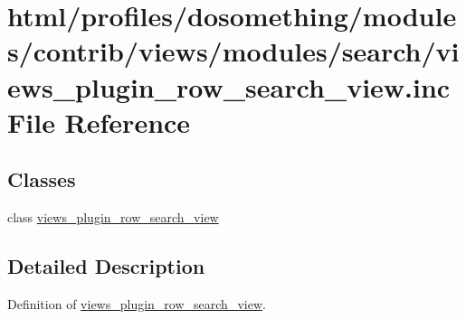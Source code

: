 \hypertarget{views__plugin__row__search__view_8inc}{
\section{html/profiles/dosomething/modules/contrib/views/modules/search/views\_\-plugin\_\-row\_\-search\_\-view.inc File Reference}
\label{views__plugin__row__search__view_8inc}
}
\subsection*{Classes}
\begin{DoxyCompactItemize}
\item 
class \hyperlink{classviews__plugin__row__search__view}{views\_\-plugin\_\-row\_\-search\_\-view}
\end{DoxyCompactItemize}


\subsection{Detailed Description}
Definition of \hyperlink{classviews__plugin__row__search__view}{views\_\-plugin\_\-row\_\-search\_\-view}. 